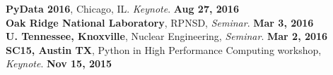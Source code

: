 \documentclass[margin,line]{resume}
\begin{document}
\begin{resume}
      \textbf{PyData 2016}, Chicago, IL. \emph{Keynote}.  \hfill\textbf{Aug 27, 2016}\\
      \textbf{Oak Ridge National Laboratory}, RPNSD, \emph{Seminar}.  \hfill\textbf{Mar 3, 2016}\\
      \textbf{U. Tennessee, Knoxville}, Nuclear Engineering, \emph{Seminar}.  \hfill\textbf{Mar 2, 2016}\\
      \textbf{SC15, Austin TX}, Python in High Performance Computing workshop, \emph{Keynote}.     \hfill\textbf{Nov 15, 2015}\\

\end{resume}
\end{document}
